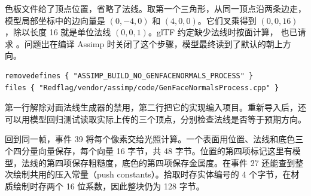 色板文件给了顶点位置，省略了法线。取第一个三角形，从同一顶点沿两条边走，模型局部坐标中的边向量是 $(0,-4,0)$ 和 $(4,0,0)$。它们叉乘得到 $(0,0,16)$，除以长度 16 就是单位法线 $(0,0,1)$。glTF 约定缺少法线时按面计算， 也已请求 。问题出在编译 Assimp 时关闭了这个步骤，模型最终读到了默认的朝上方向。

\begin{lstlisting}
removedefines { "ASSIMP_BUILD_NO_GENFACENORMALS_PROCESS" }
files { "Redflag/vendor/assimp/code/GenFaceNormalsProcess.cpp" }
\end{lstlisting}

第一行解除对面法线生成器的禁用，第二行把它的实现编入项目。重新导入后，还可以用模型回归测试读取实际上传的三个顶点，分别检查法线是否等于预期方向。

回到同一帧，事件 39 将每个像素交给光照计算。一个表面用位置、法线和底色三个四分量向量保存，每个向量 16 字节，共 48 字节。位置的第四项标记这里有模型，法线的第四项保存粗糙度，底色的第四项保存金属度。在事件 27 还能查到整次绘制共用的压入常量（push constants）。拾取时存实体编号的 4 个字节，在材质绘制时存两个 16 位系数，因此整块仍为 128 字节。
